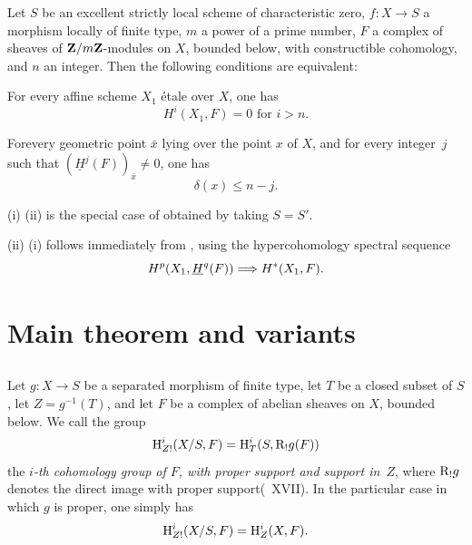 \begin{corollaire} \label{XIV.3.7}
Let $S$ be an excellent strictly local scheme of characteristic zero, $f:X \to S$ a morphism locally of finite type, $m$ a power of a prime number, $F$ a complex of sheaves of $\mathbf Z/m\mathbf Z$-modules on $X$, bounded\sisi{}{} below, with constructible cohomology, and $n$ an integer. Then the following conditions are equivalent:
\begin{enumeratei}
\item
For every affine scheme $X_1$ \'{e}tale over $X$, one has
$$
H^i(X_1, F)=0\text{ for }i>n.
$$

\item
For\pageoriginale every geometric point $\bar{x}$ lying over the point $x$ of $X$, and for every integer~$j$ such that $(\underline{H}^j(F))_{\bar{x}} \neq 0$, one has
$$
\delta(x) \leq n-j.
$$
\end{enumeratei}
\end{corollaire}

\textup{(i)} \ALORS \textup{(ii)} is the special case of  obtained by taking $S=S'$.

\textup{(ii)} \ALORS \textup{(i)} follows immediately from , using the hypercohomology spectral sequence
$$
H^p(X_1, \underline{H}^q(F)) \Longrightarrow H^*(X_1, F).
$$

\section{Main theorem and variants} \label{XIV.4}

\setcounter{subsection}{-1}

\subsection{} \label{XIV.4.0}
Let $g\colon X\to S$ be a separated morphism of finite type, let $T$ be a closed subset of $S$, let \hbox{$Z=g^{-1}(T)$}, and let $F$ be a complex of abelian sheaves on $X$, bounded below. We call the group
$$
\mathrm H_{Z!}^{i}(X/S, F)=\mathrm H_{T}^{i}(S, \mathrm R_{!}g(F))
$$
the \emph{$i$-th cohomology group of $F$, with proper support and support in~$Z$}, where $\mathrm R_{!}g$ denotes the \og direct image with proper support\fg (~XVII). In the particular case in which $g$ is proper, one simply has
$$
\mathrm H_{Z!}^{i}(X/S, F)=\mathrm H_{Z}^{i}(X, F).
$$


